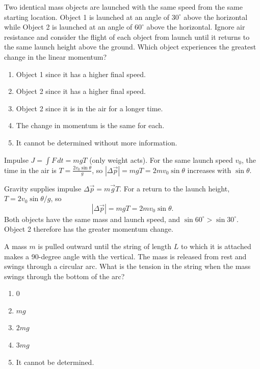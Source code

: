 \item \label{prob:1}
Two identical mass objects are launched with the same speed from the same starting location. Object 1 is launched at an angle of $30^\circ$ above the horizontal while Object 2 is launched at an angle of $60^\circ$ above the horizontal. Ignore air resistance and consider the flight of each object from launch until it returns to the same launch height above the ground. Which object experiences the greatest change in the linear momentum?
\begin{enumerate}[label=(\Alph*)]
    \item Object 1 since it has a higher final speed.
    \item Object 2 since it has a higher final speed.
    \item Object 2 since it is in the air for a longer time.
    \item The change in momentum is the same for each.
    \item It cannot be determined without more information.
\end{enumerate}

\begin{answerbox}
\end{answerbox}
\begin{insightbox}
Impulse $J=\int F\,dt=mgT$ (only weight acts). For the same launch speed $v_0$, the time in the air is $T=\tfrac{2v_0\sin\theta}{g}$, so $|\Delta\vec p|=mgT=2mv_0\sin\theta$ increases with $\sin\theta$.
\end{insightbox}
\begin{solutionbox}
Gravity supplies impulse $\Delta\vec p=m\vec gT$. For a return to the launch height, $T=2v_0\sin\theta/g$, so
\[
 |\Delta\vec p|=mgT=2mv_0\sin\theta.
\]
Both objects have the same mass and launch speed, and $\sin60^\circ>\sin30^\circ$. Object 2 therefore has the greater momentum change.
\end{solutionbox}

\item \label{prob:2}
A mass $m$ is pulled outward until the string of length $L$ to which it is attached makes a 90-degree angle with the vertical. The mass is released from rest and swings through a circular arc. What is the tension in the string when the mass swings through the bottom of the arc?
\begin{enumerate}[label=(\Alph*)]
    \item 0
    \item $mg$
    \item $2mg$
    \item $3mg$
    \item It cannot be determined.
\end{enumerate}

